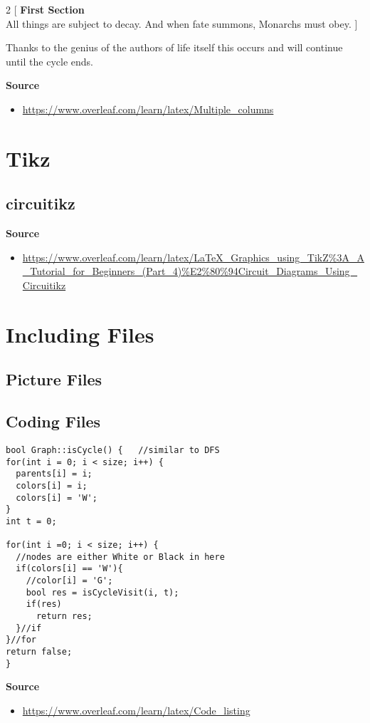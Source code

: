 \documentclass[10pt, letterpaper]{article}
\begin{document}
\begin{multicols}{2}
  [
  \noindent \textbf{First Section}\\
  All things are subject to decay. And when fate summons, Monarchs must obey.
  ]
  \blindtext
\end{multicols}
Thanks to the genius of the authors of life itself this occurs and will continue until the cycle ends.

\noindent\textbf{Source}
\begin{itemize}
  \item \url{https://www.overleaf.com/learn/latex/Multiple_columns}
\end{itemize}

\section{Tikz}
\subsection{circuitikz}
\textbf{Source}
\begin{itemize}
  \item \url{https://www.overleaf.com/learn/latex/LaTeX_Graphics_using_TikZ%3A_A_Tutorial_for_Beginners_(Part_4)%E2%80%94Circuit_Diagrams_Using_Circuitikz}
\end{itemize}

\section{Including Files}
\subsection{Picture Files}
\subsection{Coding Files}
\lstset{style=basicstyle}
\begin{lstlisting}[title=Function: Graph::isCycle()]
bool Graph::isCycle() {   //similar to DFS
for(int i = 0; i < size; i++) {
  parents[i] = i;
  colors[i] = i;
  colors[i] = 'W';
}
int t = 0;

for(int i =0; i < size; i++) {
  //nodes are either White or Black in here
  if(colors[i] == 'W'){
    //color[i] = 'G';
    bool res = isCycleVisit(i, t);
    if(res)
      return res;
  }//if
}//for
return false;
}
\end{lstlisting}
\textbf{Source}
\begin{itemize}
  \item \url{https://www.overleaf.com/learn/latex/Code_listing}
\end{itemize}
\end{document}
